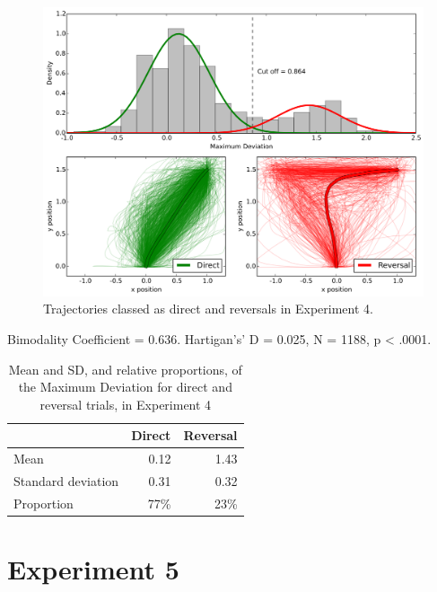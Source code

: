 \begin{figure}[ht]
  \centering
  \includegraphics[width=\textwidth]{imgs/reversals/exp4-reversals}
  \caption[]{
    \label{fig:exp4-reversals}
    Trajectories classed as direct and reversals in Experiment 4.
  }
\end{figure}


Bimodality Coefficient = 0.636.
Hartigan's' D = 0.025, N = 1188, p < .0001.

\begin{table}[hp]
  \centering
  \caption[]{
    Mean and SD, and relative proportions, of the Maximum Deviation for direct and reversal trials, in Experiment 4
    \label{tab:appendix-reversals-4}
  }
  \begin{tabular}{lrr}
    \toprule
    &   Direct &   Reversal \\
    \midrule
    Mean               &     0.12 &             1.43 \\
    Standard deviation &     0.31 &             0.32 \\
    Proportion         &    77\%    &            23\%    \\
    \bottomrule
  \end{tabular}
\end{table}

\newpage
\FloatBarrier
\section*{Experiment 5}\label{experiment-5}

